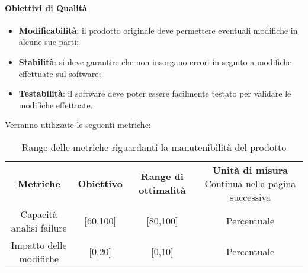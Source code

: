         \paragraph{Obiettivi di Qualità}
        \begin{itemize}
            \item \textbf{Modificabilità}: il prodotto originale deve permettere eventuali modifiche in alcune sue parti;
            \item \textbf{Stabilità}: si deve garantire che non insorgano errori in seguito a modifiche effettuate sul software;
            \item \textbf{Testabilità}: il software deve poter essere facilmente testato per validare le modifiche effettuate.
        \end{itemize}
        Verranno utilizzate le seguenti metriche:
        \begin{center}
            \renewcommand{\arraystretch}{2.2}
            
            \begin{longtable}{c c c c }
              
              \rowcolor[HTML]{232f3e}
            
              \rowcolors{1}{tableRow}{}
              \color[HTML]{FFFFFF} \textbf{Metriche} & \color[HTML]{FFFFFF} \centering\textbf{Obiettivo} & \color[HTML]{FFFFFF} \centering\textbf{Range di ottimalità} & \color[HTML]{FFFFFF} \centering\textbf{Unità di misura} 
            \endhead
            \rowcolor{white}\multicolumn{1}{c}
               { Continua nella pagina successiva} \\
               \endfoot
               \caption [Range delle metriche riguardanti la manutenibilità del prodotto]{Range delle metriche riguardanti la manutenibilità del prodotto}
              \label{tabella:reqP1}
               \endlastfoot

               Capacità analisi failure &  [60,100] & [80,100] & Percentuale \\
				 Impatto delle modifiche & [0,20] & [0,10] & Percentuale \\
            \end{longtable}

        \end{center}
       \pagebreak
